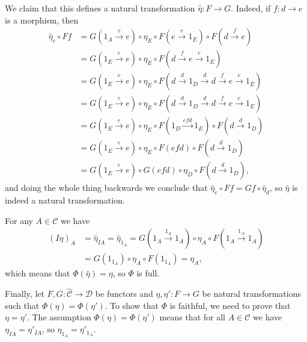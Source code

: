 We claim that this defines a natural transformation $\hat{\eta}\colon F \to G$. Indeed,
if $f\colon d\to e$ is a morphism, then
\begin{align*}
	\hat{\eta}_e \circ Ff &= G(1_A\stackrel{e}{\longrightarrow}e) \circ\eta_E \circ F(e\stackrel{e}{\longrightarrow}1_E) \circ F(d\stackrel{f}{\longrightarrow} e)\\
	&= G(1_E\stackrel{e}{\longrightarrow}e) \circ\eta_E \circ F(d\stackrel{f}{\longrightarrow}e\stackrel{e}{\longrightarrow}1_E)\\
	&= G(1_E\stackrel{e}{\longrightarrow}e) \circ\eta_E \circ F(d\stackrel{d}{\longrightarrow}1_D\stackrel{d}{\longrightarrow}d\stackrel{f}{\longrightarrow}e\stackrel{e}{\longrightarrow}1_E)\\
	&= G(1_E\stackrel{e}{\longrightarrow}e) \circ\eta_E \circ F(d\stackrel{d}{\longrightarrow}1_D\stackrel{d}{\longrightarrow}d\stackrel{f}{\longrightarrow}e\stackrel{e}{\longrightarrow}1_E)\\
	&= G(1_E\stackrel{e}{\longrightarrow}e) \circ\eta_E \circ F(1_D\stackrel{efd}{\longrightarrow}1_E)\circ F(d\stackrel{d}{\longrightarrow}1_D)\\
	&= G(1_E\stackrel{e}{\longrightarrow}e) \circ\eta_E \circ F(efd)\circ F(d\stackrel{d}{\longrightarrow}1_D)\\
	&= G(1_E\stackrel{e}{\longrightarrow}e) \circ G(efd) \circ \eta_D\circ F(d\stackrel{d}{\longrightarrow}1_D),
\end{align*}
and doing the whole thing backwards we conclude that $\hat{\eta}_e \circ Ff = Gf \circ \hat{\eta}_d$,
so $\hat{\eta}$ is indeed a natural transformation.

For any $A \in \mathcal{C}$ we have
\begin{align*}
	(I\hat{\eta})_A &= \hat{\eta}_{IA} = \hat{\eta}_{1_A} = G(1_A \stackrel{1_A}{\longrightarrow}1_A) \circ \eta_A \circ F(1_A\stackrel{1_A}{\longrightarrow}1_A)\\
	&= G(1_{1_A}) \circ \eta_A \circ F(1_{1_A}) = \eta_A,
\end{align*}
which means that $\Phi(\hat{\eta}) = \eta$, so $\Phi$ is full.

Finally, let $F, G\colon \widehat{\mathcal{C}}\to \mathcal{D}$ be functors and
$\eta, \eta'\colon F\to G$ be natural transformations such that $\Phi(\eta) = \Phi(\eta')$.
To show that $\Phi$ is faithful, we need to prove that $\eta = \eta'$.
The assumption $\Phi(\eta) = \Phi(\eta')$ means that for all $A \in \mathcal{C}$
we have $\eta_{IA} = \eta'_{IA}$, so $\eta_{1_A} = \eta'_{1_A}$.

